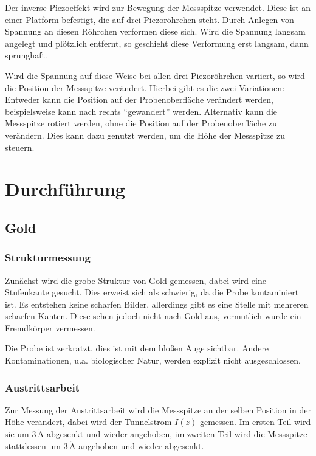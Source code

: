 \documentclass[12pt,a4paper]{scrartcl}
\numberwithin{equation}{section} %
\begin{document}
Der inverse Piezoeffekt wird zur Bewegung der Messspitze verwendet.
Diese ist an einer Platform befestigt, die auf drei Piezoröhrchen steht.
Durch Anlegen von Spannung an diesen Röhrchen verformen diese sich. Wird
die Spannung langsam angelegt und plötzlich entfernt, so geschieht diese
Verformung erst langsam, dann sprunghaft.

Wird die Spannung auf diese Weise bei allen drei Piezoröhrchen variiert,
so wird die Position der Messspitze verändert. Hierbei gibt es die zwei
Variationen: Entweder kann die Position auf der Probenoberfläche
verändert werden, beispielsweise kann nach rechts ``gewandert'' werden.
Alternativ kann die Messspitze rotiert werden, ohne die Position auf der
Probenoberfläche zu verändern. Dies kann dazu genutzt werden, um die
Höhe der Messspitze zu steuern.

\clearpage
\hypertarget{durchfuxfchrung}{%
\section{Durchführung}\label{durchfuxfchrung}}

\hypertarget{gold}{%
\subsection{Gold}\label{gold}}

\hypertarget{strukturmessung}{%
\subsubsection{Strukturmessung}\label{strukturmessung}}

Zunächst wird die grobe Struktur von Gold gemessen, dabei wird eine
Stufenkante gesucht. Dies erweist sich als schwierig, da die Probe
kontaminiert ist. Es entstehen keine scharfen Bilder, allerdings gibt es
eine Stelle mit mehreren scharfen Kanten. Diese sehen jedoch nicht nach
Gold aus, vermutlich wurde ein Fremdkörper vermessen.

Die Probe ist zerkratzt, dies ist mit dem bloßen Auge sichtbar. Andere
Kontaminationen, u.a. biologischer Natur, werden explizit nicht
ausgeschlossen.

\hypertarget{austrittsarbeit}{%
\subsubsection{Austrittsarbeit}\label{austrittsarbeit}}

Zur Messung der Austrittsarbeit wird die Messspitze an der selben
Position in der Höhe verändert, dabei wird der Tunnelstrom $I(z)$
gemessen. Im ersten Teil wird sie um $3\,\mathrm{\mathring{A}}$
abgesenkt und wieder angehoben, im zweiten Teil wird die Messspitze
stattdessen um $3\,\mathrm{\mathring{A}}$ angehoben und wieder
abgesenkt.
\end{document}
